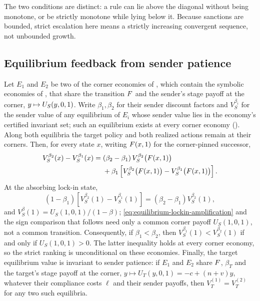 The two conditions are distinct: a rule can lie above the diagonal
without being monotone, or be strictly monotone while lying below it.
Because sanctions are bounded, strict escalation here means a strictly
increasing convergent sequence, not unbounded growth.

\subsection{Equilibrium feedback from sender patience}

\begin{proposition}
\label{prop:equilibrium-patience-feedback}
Let $E_1$ and $E_2$ be two of the corner economies of
, which contain the symbolic economies of
, that share the transition $F$ and the sender's
stage payoff at the corner, $y\mapsto U_S(y,0,1)$. Write $\beta_1,\beta_2$ for
their sender discount factors and $V_S^{\beta_i}$ for the sender value of any
equilibrium of $E_i$ whose sender value lies in the economy's certified invariant set;
such an equilibrium exists at every corner economy ().
Along both equilibria the target policy and both realized actions remain
at their corners. Then, for every state $x$, writing $F(x,1)$ for the
corner-pinned successor,
\begin{align}
V_S^{\beta_2}(x)-V_S^{\beta_1}(x)
={}&(\beta_2-\beta_1)\,
V_S^{\beta_2}\bigl(F(x,1)\bigr) \label{eq:equilibrium-feedback}\\
&+\beta_1\left[
V_S^{\beta_2}\bigl(F(x,1)\bigr)
-V_S^{\beta_1}\bigl(F(x,1)\bigr)\right].\nonumber
\end{align}
At the absorbing lock-in state,
\begin{equation}
(1-\beta_1)
\left[V_S^{\beta_2}(1)-V_S^{\beta_1}(1)\right]
=
(\beta_2-\beta_1)V_S^{\beta_2}(1),
\label{eq:equilibrium-lockin-amplification}
\end{equation}
and $V_S^{\beta}(1)=U_S(1,0,1)/(1-\beta)$;
\eqref{eq:equilibrium-lockin-amplification} and the sign comparison that follows
need only a common corner payoff $U_S(1,0,1)$, not a common transition.
Consequently, if
$\beta_1<\beta_2$, then
$V_S^{\beta_1}(1)<V_S^{\beta_2}(1)$ if and only if
$U_S(1,0,1)>0$. The latter inequality holds at every corner economy,
so the strict ranking is unconditional on these economies. Finally, the
target equilibrium value is invariant to sender patience: if $E_1$ and
$E_2$ share $F$, $\beta_T$ and the target's stage payoff at the corner,
$y\mapsto U_T(y,0,1)=-c+(n+v)y$, whatever their compliance costs $\ell$ and
their sender payoffs, then $V_T^{(1)}=V_T^{(2)}$ for any two such
equilibria.
\end{proposition}

